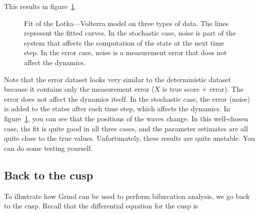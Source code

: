 \documentclass[
  a4paper,
  DIV=11,
  numbers=noendperiod,
  oneside]{scrreprt}
\begin{document}
This results in figure~\ref{fig-ch4n-img1-old-49}.

\begin{figure}


\caption{\label{fig-ch4n-img1-old-49}Fit of the Lotka---Volterra model
on three types of data. The lines represent the fitted curves. In the
stochastic case, noise is part of the system that affects the
computation of the state at the next time step. In the error case, noise
is a measurement error that does not affect the dynamics.}

\end{figure}%

Note that the error dataset looks very similar to the deterministic
dataset because it contains only the measurement error (\(X\) is true
score + error). The error does not affect the dynamics itself. In the
stochastic case, the error (noise) is added to the states after each
time step, which affects the dynamics. In
figure~\ref{fig-ch4n-img1-old-49}, you can see that the positions of the
waves change. In this well-chosen case, the fit is quite good in all
three cases, and the parameter estimates are all quite close to the true
values. Unfortunately, these results are quite unstable. You can do some
testing yourself.

\subsection{Back to the cusp}\label{sec-Back-to-the-cusp}

To illustrate how Grind can be used to perform bifurcation analysis, we
go back to the cusp. Recall that the differential equation for the cusp
is
\end{document}
